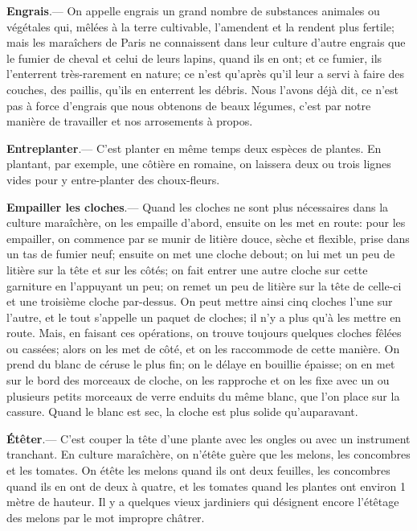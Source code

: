 \documentclass[10pt,a4paper]{book}
\begin{document}
\textbf{Engrais}.--- On appelle engrais un grand nombre de substances animales ou végétales qui, mêlées à la terre cultivable, l'amendent et la rendent plus fertile; mais les maraîchers de Paris ne connaissent dans leur culture d'autre engrais que le fumier de cheval et celui de leurs lapins, quand ils en ont; et ce fumier, ils l'enterrent très-rarement en nature; ce n'est qu'après qu'il leur a servi à faire des couches, des paillis, qu'ils en enterrent les débris. Nous l'avons déjà dit, ce n'est pas à force d'engrais que nous obtenons de beaux légumes, c'est par notre manière de travailler et nos arrosements à propos.

\textbf{Entreplanter}.--- C'est planter en même temps deux espèces de plantes. En plantant, par exemple, une côtière en romaine, on laissera deux ou trois lignes vides pour y entre-planter des choux-fleurs.

\textbf{Empailler les cloches}.--- Quand les cloches ne sont plus nécessaires dans la culture maraîchère, on les empaille d'abord, ensuite on les met en route: pour les empailler, on commence par se munir de litière douce, sèche et flexible, prise dans un tas de fumier neuf; ensuite on met une cloche debout; on lui met un peu de litière sur la tête et sur les côtés; on fait entrer une autre cloche sur cette garniture en l'appuyant un peu; on remet un peu de litière sur la tête de celle-ci et une troisième cloche par-dessus. On peut mettre ainsi cinq cloches l'une sur l'autre, et le tout s'appelle un paquet de cloches; il n'y a plus qu'à les mettre en route. Mais, en faisant ces opérations, on trouve toujours quelques cloches fêlées ou cassées; alors on les met de côté, et on les raccommode de cette manière. On prend du blanc de céruse le plus fin; on le délaye en bouillie épaisse; on en met sur le bord des morceaux de cloche, on les rapproche et on les fixe avec un ou plusieurs petits morceaux de verre enduits du même blanc, que l'on place sur la cassure. Quand le blanc est sec, la cloche est plus solide qu'auparavant.

\textbf{Étêter}.--- C'est couper la tête d'une plante avec les ongles ou avec un instrument tranchant. En culture maraîchère, on n'étête guère que les melons, les concombres et les tomates. On étête les melons quand ils ont deux feuilles, les concombres quand ils en ont de deux à quatre, et les tomates quand les plantes ont environ 1 mètre de hauteur. Il y a quelques vieux jardiniers qui désignent encore l'étêtage des melons par le mot impropre châtrer.
\end{document}
